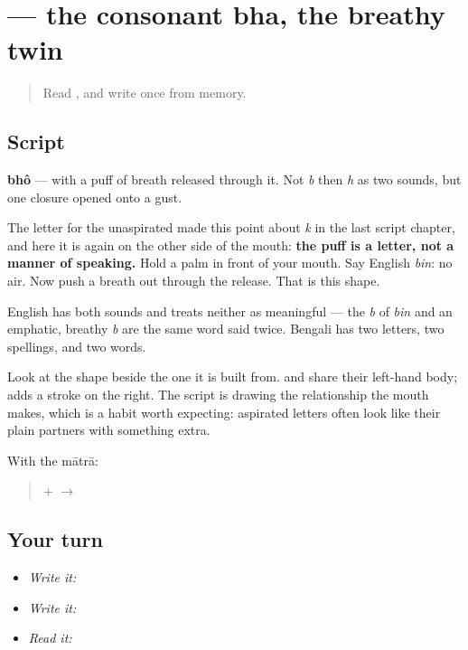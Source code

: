 \section[\texorpdfstring{\bn{ভ} (bhô)}{ভ (bhô)}]{ — the consonant bha, the breathy twin}

\label{lesson:BN-W03-bha}



\begin{quote}
Read \textbf{}, and write \textbf{} once from memory.
\end{quote}

\subsection*{Script}

\begin{quote}
\end{quote}

\textbf{bhô} — \textbf{} with a puff of breath released through it. Not \emph{b} then \emph{h} as two sounds, but one closure opened onto a gust.

The letter for the unaspirated \textbf{} made this point about \emph{k} in the last script chapter, and here it is again on the other side of the mouth: \textbf{the puff is a letter, not a manner of speaking.} Hold a palm in front of your mouth. Say English \emph{bin}: no air. Now push a breath out through the release. That is this shape.

English has both sounds and treats neither as meaningful — the \emph{b} of \emph{bin} and an emphatic, breathy \emph{b} are the same word said twice. Bengali has two letters, two spellings, and two words.

Look at the shape beside the one it is built from. \textbf{} and \textbf{} share their left-hand body; \textbf{} adds a stroke on the right. The script is drawing the relationship the mouth makes, which is a habit worth expecting: aspirated letters often look like their plain partners with something extra.

With the mātrā:

\begin{quote}
\textbf{} + \textbf{} $\to$ \textbf{}
\end{quote}

\subsection*{Your turn}
\begin{itemize}
\raggedright
  \item \emph{Write it:} 
  \item \emph{Write it:}  
  \item \emph{Read it:} 
\end{itemize}

